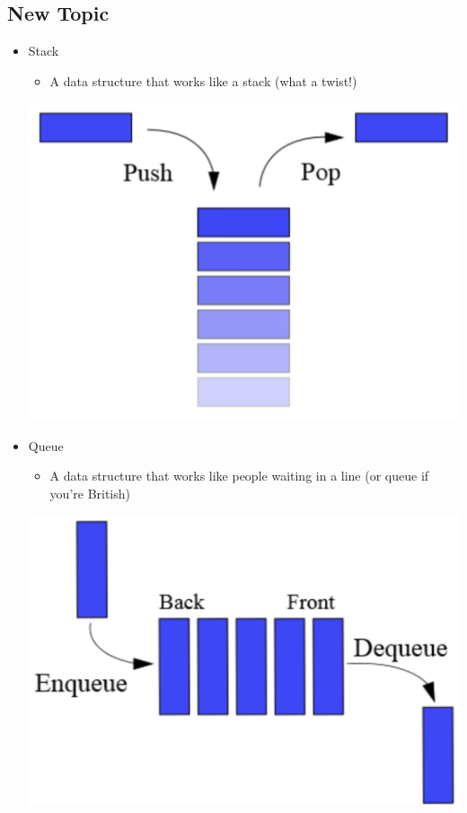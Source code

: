 \documentclass[10pt]{article}
\begin{document}
\subsection*{New Topic}
\begin{itemize}
    \item Stack
    \begin{itemize}
        \item A data structure that works like a stack (what a twist!)
    \end{itemize}
    \begin{center}
    \includegraphics[width=\textwidth/3]{images/1.png}
    \end{center}
    \item Queue
    \begin{itemize}
        \item A data structure that works like people waiting in a line (or queue if you're British)
    \end{itemize}
    \begin{center}
    \includegraphics[width=\textwidth/3]{images/2.png}
    \end{center}
\end{itemize}
\end{document}
